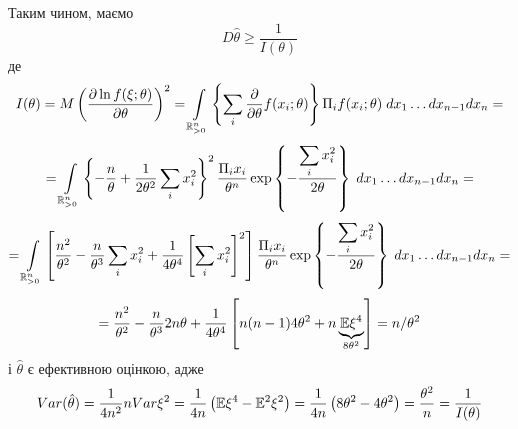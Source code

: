 \documentclass[12pt]{article} %
\begin{document}
	Таким чином, маємо
	\[D\hat{\theta}\geq\frac{1}{I(\theta)}\]
	де
	\[I(\theta)=M\mybra{\frac{\partial\ln f(\xi;\theta)}{\partial\theta}}^2=
	\int_{\mathbb{R}^n_{>0}}\mycbra{\sum_i\frac{\partial}{\partial\theta}f(x_i;\theta)}
	\Pi_i f(x_i;\theta)\;dx_1\hdots dx_{n-1}dx_n=
	\]\[=
	\int_{\mathbb{R}^n_{>0}}\mycbra{-\frac{n}{\theta}+\frac{1}{2\theta^2}\sum_ix_i^2
	}^2
	\frac{\Pi_i x_i}{\theta^n}\exp\mycbra{-\frac{\sum_ix_i^2}{2\theta}}\;dx_1\hdots dx_{n-1}dx_n=\]
	\[=\int_{\mathbb{R}^n_{>0}}\mysbra{\frac{n^2}{\theta^2}-\frac{n}{\theta^3}\sum_ix_i^2+\frac{1}{4\theta^4}\mysbra{
	\sum_ix_i^2}^2}
	\frac{\Pi_i x_i}{\theta^n}\exp\mycbra{-\frac{\sum_ix_i^2}{2\theta}}\;dx_1\hdots dx_{n-1}dx_n=\]
	\[=\frac{n^2}{\theta^2}-\frac{n}{\theta^3}2n\theta+\frac{1}{4\theta^4}\left[n(n-1)4\theta^2+n\underbrace{\mathbb{E}\xi^4}_
	{8\theta^2}\right]=n/\theta^2\]
	і $\hat{\theta}$ є ефективною оцінкою, адже
	\[Var(\hat{\theta})=\frac{1}{4n^2}nVar\xi^2=\frac{1}{4n}\left(\mathbb{E}\xi^4-\mathbb{E}^2\xi^2\right)=
	\frac{1}{4n}\left(8\theta^2-4\theta^2\right)=\frac{\theta^2}{n}=\frac{1}{I(\theta)}\]
\end{document}
